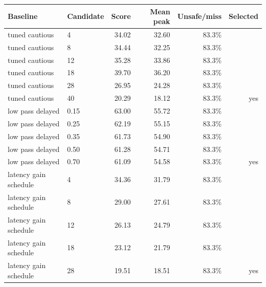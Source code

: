 \begin{tabular}{llrrrr}\toprule
Baseline & Candidate & Score & Mean peak & Unsafe/miss & Selected\\
\midrule
tuned cautious & 4 & 34.02 & 32.60 & 83.3\% & \\
tuned cautious & 8 & 34.44 & 32.25 & 83.3\% & \\
tuned cautious & 12 & 35.28 & 33.86 & 83.3\% & \\
tuned cautious & 18 & 39.70 & 36.20 & 83.3\% & \\
tuned cautious & 28 & 26.95 & 24.28 & 83.3\% & \\
tuned cautious & 40 & 20.29 & 18.12 & 83.3\% & yes\\
low pass delayed & 0.15 & 63.00 & 55.72 & 83.3\% & \\
low pass delayed & 0.25 & 62.19 & 55.15 & 83.3\% & \\
low pass delayed & 0.35 & 61.73 & 54.90 & 83.3\% & \\
low pass delayed & 0.50 & 61.28 & 54.71 & 83.3\% & \\
low pass delayed & 0.70 & 61.09 & 54.58 & 83.3\% & yes\\
latency gain schedule & 4 & 34.36 & 31.79 & 83.3\% & \\
latency gain schedule & 8 & 29.00 & 27.61 & 83.3\% & \\
latency gain schedule & 12 & 26.13 & 24.79 & 83.3\% & \\
latency gain schedule & 18 & 23.12 & 21.79 & 83.3\% & \\
latency gain schedule & 28 & 19.51 & 18.51 & 83.3\% & yes\\
\bottomrule\end{tabular}

